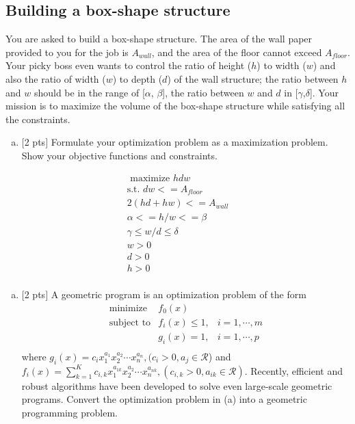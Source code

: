 \documentclass[12pt]{article}
\begin{document}
\vspace{.25cm}

\subsection{Building a box-shape structure}
You are asked to build a box-shape structure. The area of the wall paper provided to you for the job is $A_{wall}$, and the area of the floor cannot exceed $A_{floor}$. Your picky boss even wants to control the ratio of height ($h$) to width ($w$) and also the ratio of width ($w$) to depth ($d$) of the wall structure; the ratio between $h$ and $w$ should be in the range of [$\alpha$, $\beta$], the ratio between $w$ and $d$ in [$\gamma$,$\delta$]. Your mission is to maximize the volume of the box-shape structure while satisfying all the constraints. 
\begin{enumerate}[(a)]
\item $[$2 pts$]$ Formulate your optimization problem as a maximization problem. Show your objective functions and constraints.
\end{enumerate}

\begin{align*}
\text{ maximize } hdw \\
\text{s.t. } dw <= A_{floor} \\
2(hd +hw) <= A_{wall} \\
\alpha <= h/w <= \beta \\
\gamma \leq w/d \leq \delta \\
w>0 \\
d>0 \\
h>0  \\
\end{align*}
\vspace{.25cm}

\begin{enumerate}[(b)]
\item $[$2 pts$]$ A geometric program is an optimization problem of the form
\begin{eqnarray*}
\text{minimize} & f_{0}(x) &\\
\text{subject to} & f_{i}(x) \leq 1, & i=1,\cdots,m\\
 & g_{i}(x) = 1, & i=1,\cdots,p\\
\end{eqnarray*}
where $g_{i}(x) = c_{i}x_{1}^{a_{1}}x_{2}^{a_{2}}\cdots x_{n}^{a_{n}}, (c_{i}>0, a_{j}\in \mathcal{R}$) and $f_{i}(x) = \sum_{k=1}^{K}c_{i,k}x_{1}^{a_{1k}}x_{2}^{a_{2}}\cdots x_{n}^{a_{nk}}, (c_{i,k}>0, a_{ik}\in \mathcal{R})$. Recently, efficient and robust algorithms have been developed to solve even large-scale geometric programs. Convert the optimization problem in (a) into a geometric programming problem.
\end{enumerate}
\end{document}

